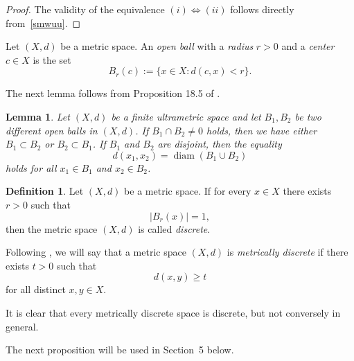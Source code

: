\documentclass[11pt]{article}
\newtheorem{lemma}[theorem]{Lemma}
\theoremstyle{definition}
\newtheorem{definition}[theorem]{Definition}
\theoremstyle{remark}
\numberwithin{equation}{section}
\begin{document}
\begin{proof}
    The validity of the equivalence $(i)\Leftrightarrow (ii)$ follows directly from~\eqref{smwuu}. 
\end{proof} 








Let \((X, d)\) be a metric space. An \emph{open ball} with a \emph{radius} \(r > 0\) and a \emph{center} \(c \in X\) is the set
\[
B_r(c) := \{x \in X \colon d(c, x) < r\}.
\]



The next lemma follows from Proposition 18.5 of \cite{Sch1984}.
\begin{lemma}\label{dcfghm}
Let $(X,d)$ be a finite ultrametric space and let $B_1, B_2$ be two different open balls in $(X,d)$. If $B_1 \cap B_2 \neq 0$ holds, then we have either $B_1 \subset B_2$ or $B_2 \subset B_1$. If $B_1$ and $B_2$ are disjoint, then the equality
\[
d(x_1, x_2) = \operatorname{diam}(B_1 \cup B_2)
\]
holds for all $x_1 \in B_1$ and $x_2 \in B_2$.
\end{lemma}



\begin{definition}
\label{alfth}
Let $(X,d)$ be a metric space. If for every 
 $x \in X$ there exists $r > 0$ such that  
\[
\left|B_r(x) \right|= 1,
\]
then
 the metric space $(X, d)$ is called \textit{discrete}.  


\end{definition}


Following \cite[p.~48]{Dez-Dez}, we will say that a metric space $(X,d)$ is 
{\it metrically discrete} if there exists $t>0$ such that 
\begin{equation}\label{mytr}
d(x,y) \geq t 
\end{equation}
for all distinct $ x, y \in X.$



It is clear that every metrically discrete space is discrete, but not conversely in general.

The next proposition will be used in Section~5 below.
\end{document}
